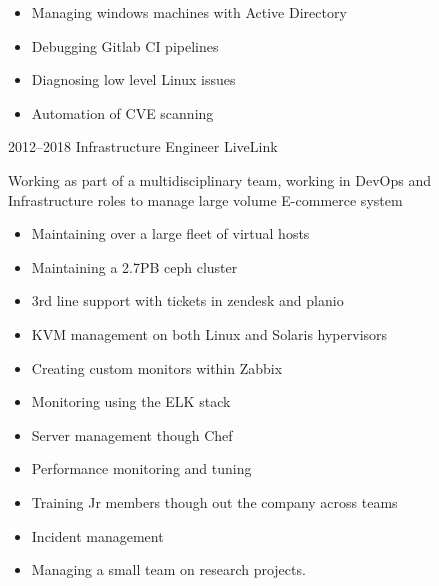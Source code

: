 \documentclass[]{friggeri-cv-a4}
\begin{document}
\begin{entrylist}
{\begin{itemize}
        \item Managing windows machines with Active Directory
        \item Debugging Gitlab CI pipelines
        \item Diagnosing low level Linux issues
        \item Automation of CVE scanning
      \end{itemize}
    }
   \entry{}
  	{2012--2018}
  	{Infrastructure Engineer}
  	{LiveLink}
  	{
      Working as part of a multidisciplinary team, working in DevOps and Infrastructure roles to manage large volume E-commerce system
    \begin{itemize}
      \item Maintaining over a large fleet of virtual hosts
      \item Maintaining a 2.7PB ceph cluster
      \item 3rd line support with tickets in zendesk and planio
      \item KVM management on both Linux and Solaris hypervisors
      \item Creating custom monitors within Zabbix
      \item Monitoring using the ELK stack
      \item Server management though Chef
      \item Performance monitoring and tuning
      \item Training Jr members though out the company across teams
      \item Incident management
      \item Managing a small team on research projects.
    \end{itemize}
    }
 \end{entrylist}
\end{document}
